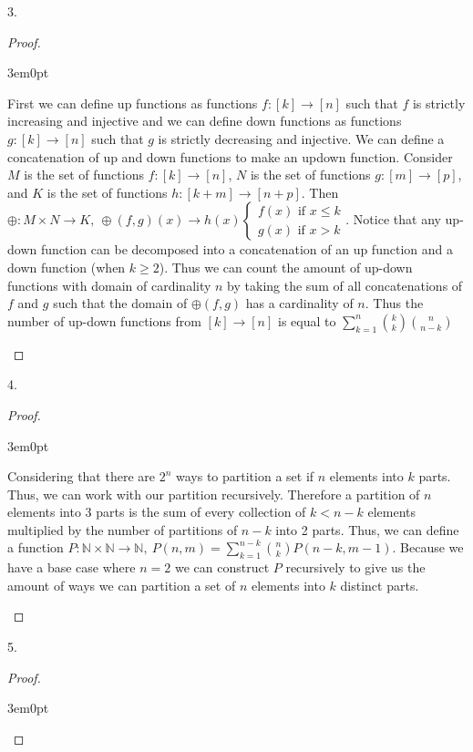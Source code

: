 \documentclass[11pt]{article}
\newcommand{\N}{\mathbb{N}}
\newenvironment{myproof}
{\begin{proof} \begin{adjustwidth}{3em}{0pt}$ $\par\nobreak\ignorespaces}
{\end{adjustwidth} \end{proof}}
\begin{document}
\begin{flushleft}
\newpage

3.

\begin{myproof}

First we can define up functions as functions $f:[k] \to [n]$ such that $f$ is strictly increasing and injective and we can define down functions as functions $g:[k] \to [n]$ such that $g$ is strictly decreasing and injective. We can define a concatenation of up and down functions to make an updown function. Consider $M$ is the set of functions $f:[k] \to [n]$, $N$ is the set of functions $g:[m] \to [p]$, and $K$ is the set of functions $h:[k+m] \to [n+p]$. Then $\oplus: M \times N \to K, \  \oplus(f,g)(x) \to h(x) \begin{cases} f(x) \text{ if $x \leq k$} \\ g(x) \text{ if $x > k$} \end{cases}$. Notice that any up-down function can be decomposed into a concatenation of an up function and a down function (when $k \geq 2$). Thus we can count the amount of up-down functions with domain of cardinality $n$ by taking the sum of all concatenations of $f$ and $g$ such that the domain of $\oplus(f,g)$ has a cardinality of $n$. Thus the number of up-down functions from $[k] \to [n]$ is equal to $\sum_{k=1}^n {k \choose k}{n \choose n-k}$ 

\end{myproof}


\newpage

4.

\begin{myproof}

Considering that there are $2^n$ ways to partition a set if $n$ elements into $k$ parts. Thus, we can work with our partition recursively. Therefore a partition of $n$ elements into 3 parts is the sum of every collection of $k<n-k$ elements multiplied by the number of partitions of $n-k$ into 2 parts. Thus, we can define a function $P:\N \times \N \to \N, \ P(n,m) = \sum_{k=1}^{n-k}{n \choose k} P(n-k,m-1)$. Because we have a base case where $n= 2$ we can construct $P$ recursively to give us the amount of ways we can partition a set of $n$ elements into $k$ distinct parts.

\end{myproof}

\newpage

5.

\begin{myproof}


\end{myproof}
\end{flushleft}
\end{document}
